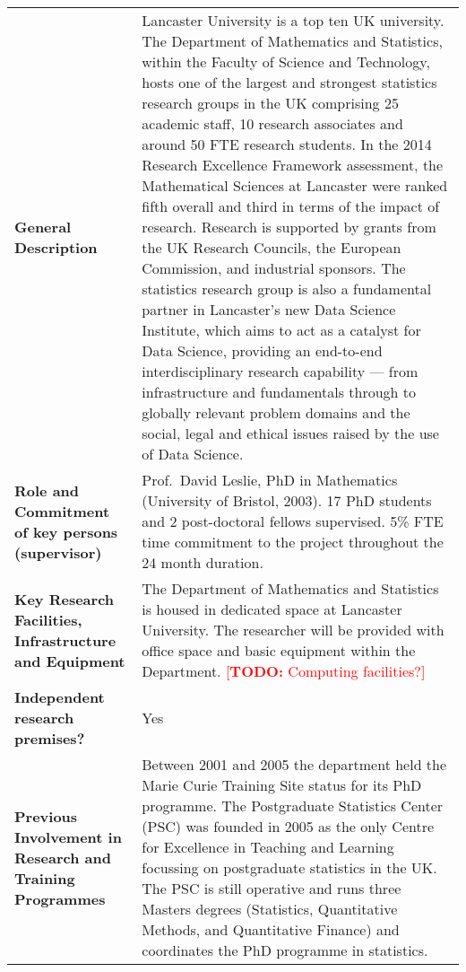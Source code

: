 \documentclass[a4paper,11pt]{article}
\newcommand{\TODO}[1]{{\textcolor{red}{[\textbf{TODO:} #1]}}}
\begin{document}
{\fontsize{9bp}{1em}\selectfont %
\noindent\begin{tabular}{>{\raggedright}p{}p{}}
  \multicolumn{2}{l}{\textbf{Beneficiary: Lancaster University}} \\\midrule
\textbf{General Description} & Lancaster University is a top ten UK university.  The Department of Mathematics and Statistics, within the Faculty
of Science and Technology, hosts one of the largest and strongest statistics research groups in the
UK comprising 25 academic staff, 10 research associates and around 50 FTE research students. In the 2014
Research Excellence Framework assessment, the Mathematical Sciences at Lancaster were ranked fifth overall and third in
terms of the impact of research.  Research is supported by grants from the UK Research Councils, the European Commission, and industrial sponsors. The statistics research group is also a fundamental partner in Lancaster's new Data Science Institute, which aims to act as a catalyst for Data Science, providing an end-to-end interdisciplinary research capability --- from infrastructure and fundamentals through to globally relevant problem domains and the social, legal and ethical issues raised by the use of Data Science. 

\\\midrule
\textbf{Role and Commitment of key persons (supervisor)} &
Prof.\ David Leslie, PhD in Mathematics (University of Bristol, 2003).  17 PhD students and 2 post-doctoral fellows supervised. 5\% FTE time commitment to the project throughout the 24 month duration.
\\\midrule
\textbf{Key Research Facilities, Infrastructure and Equipment} &
The Department of Mathematics and Statistics is housed in dedicated space at Lancaster University.  The researcher will be provided with office space and basic equipment within the Department. \TODO{Computing facilities?}


\\\midrule
\textbf{Independent research premises?} & Yes

\\\midrule
\textbf{Previous Involvement in Research and Training Programmes} &
Between 2001 and 2005 the department held the Marie Curie Training Site status for its PhD programme. The Postgraduate Statistics Center (PSC) was founded in 2005 as the only Centre for Excellence in Teaching and Learning focussing on postgraduate statistics in the UK. The PSC is still operative and runs three Masters degrees (Statistics, Quantitative Methods, and Quantitative Finance) and coordinates the PhD programme in statistics.



\end{tabular}}
\end{document}
